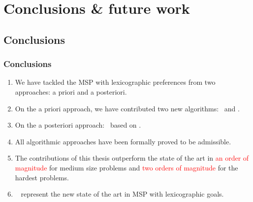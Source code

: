 %
%
%
%

\section{Conclusions \& future work}

\subsection{Conclusions}
\begin{frame} 
\frametitle{Conclusions}
	\begin{enumerate}
		\item We have tackled the \textcolor{ao}{MSP with lexicographic preferences} from two approaches: \textcolor{ao}{a priori} and \textcolor{ao}{a posteriori}.
		\item On the a priori approach, we have contributed two new algorithms: \textcolor{ao}{\lexgo} \ and \textcolor{ao}{\lexgodr}. 
		\item On the a posteriori approach: \textcolor{ao}{\namoadr} \ based on \namoa.
		\item All algorithmic approaches have been \textcolor{ao}{formally proved to be admissible}.
		\item The contributions of this thesis \textcolor{ao}{outperform the state of the art} in \textcolor{red}{an order of magnitude} for medium size problems and \textcolor{red}{two orders of magnitude} for the hardest problems. 
		\item \textcolor{ao}{\namoadr} \ \textcolor{ao}{\lexgodr} represent \textcolor{ao}{the new state of the art} in \textcolor{ao}{MSP with lexicographic goals}.
	\end{enumerate}
\note{}
\end{frame}

